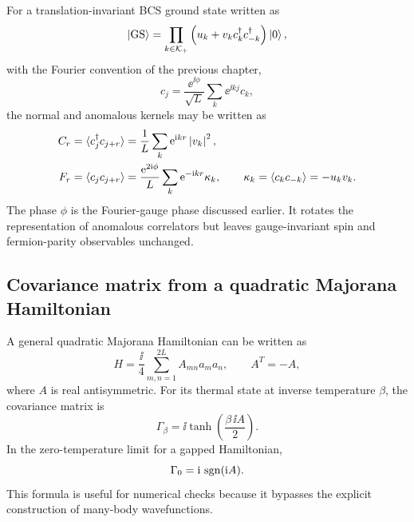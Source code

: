 For a translation-invariant BCS ground state written as
\begin{equation}
    \left|\mathrm{GS}\right\rangle
    =
    \prod_{k\in\mathcal{K}_+}
    \left(u_k+v_kc_k^\dagger c_{-k}^\dagger\right)\left|0\right\rangle,
\end{equation}
with the Fourier convention of the previous chapter,
\begin{equation}
    c_j=\frac{\ee^{\ii\phi}}{\sqrt{L}}\sum_k\ee^{\ii kj}c_k,
\end{equation}
the normal and anomalous kernels may be written as
\begin{align}
\label{eq:translation-invariant-C-r}
    C_r
    &=
    \langle c_j^\dagger c_{j+r}\rangle
    =
    \frac{1}{L}\sum_k\mathrm{e}^{\mathrm{i} kr}\left|v_k\right|^2,\\
\label{eq:translation-invariant-F-r}
    F_r
    &=
    \langle c_j c_{j+r}\rangle
    =
    \frac{\mathrm{e}^{2\mathrm{i}\phi}}{L}\sum_k\mathrm{e}^{-\mathrm{i} kr}\kappa_k,
    \qquad
    \kappa_k=\langle c_kc_{-k}\rangle=-u_kv_k.
\end{align}
The phase $\phi$ is the Fourier-gauge phase discussed earlier.  It rotates the
representation of anomalous correlators but leaves gauge-invariant spin and
fermion-parity observables unchanged.

\subsection*{Covariance matrix from a quadratic Majorana Hamiltonian}

A general quadratic Majorana Hamiltonian can be written as
\begin{equation}
\label{eq:majorana-quadratic-hamiltonian}
    H=\frac{\ii}{4}\sum_{m,n=1}^{2L}A_{mn}a_ma_n,
    \qquad
    A^T=-A,
\end{equation}
where $A$ is real antisymmetric.  For its thermal state at inverse temperature
$\beta$, the covariance matrix is
\begin{equation}
\label{eq:thermal-gamma-majorana-hamiltonian}
    \Gamma_\beta
    =
    \ii\tanh\left(\frac{\beta\,\ii A}{2}\right).
\end{equation}
In the zero-temperature limit for a gapped Hamiltonian,
\begin{equation}
\label{eq:ground-state-gamma-sign-function}
    \Gamma_0=\mathrm{i}\,\operatorname{sgn}(\mathrm{i} A).
\end{equation}
This formula is useful for numerical checks because it bypasses the explicit
construction of many-body wavefunctions.

